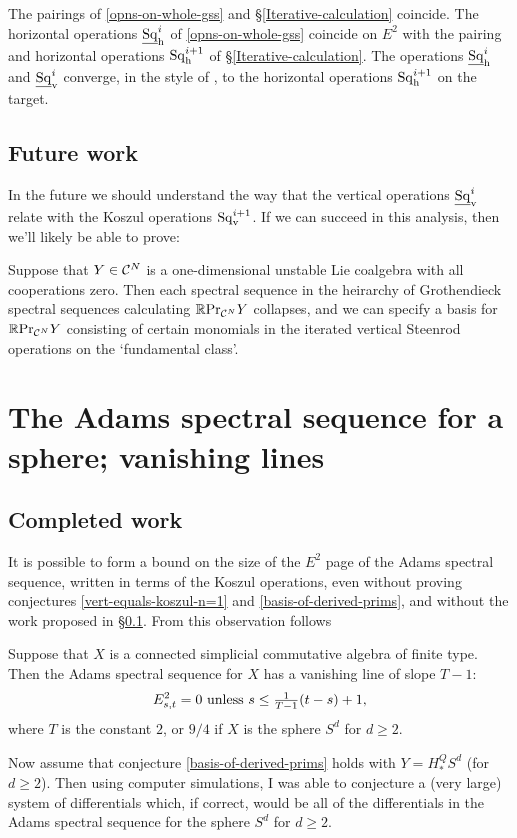 \documentclass[11pt]{article}
\newcommand{\Sq}{\mathrm{Sq}}
\begin{document}
\begin{thm}
The pairings of \ref{opns-on-whole-gss} and \S\ref{Iterative-calculation} coincide. The horizontal operations $\underline{\Sq}_\textup{h}^i$ of \ref{opns-on-whole-gss} coincide on $E^2$ with the pairing and horizontal operations ${\Sq}_\textup{h}^{i+1}$ of \S\ref{Iterative-calculation}. The operations $\underline{\Sq}_\textup{h}^i$ and $\underline{\Sq}_\textup{v}^i$ converge, in the style of \cite{SingerSteen1.pdf}, to the horizontal operations ${\Sq}_\textup{h}^{i+1}$ on the target.
\end{thm}
\subsection{Future work}\label{work-on-kos-opns-n>1}
In the future we should understand the way that the vertical operations $\underline{\Sq}_\textup{v}^i$ relate with the Koszul operations $\Sq_\textup{v}^{i+1}$.
If we can succeed in this analysis, then we'll likely be able to prove:
\begin{conjecture}\label{basis-of-derived-prims}
Suppose that $Y\in\mathcal{C}^N$ is a one-dimensional unstable Lie coalgebra with all cooperations zero. Then each spectral sequence in the heirarchy of Grothendieck spectral sequences calculating $\mathbb{R}\textup{Pr}_{\mathcal{C}^N}Y$ collapses, and we can specify a basis for $\mathbb{R}\textup{Pr}_{\mathcal{C}^N}Y$ consisting of certain monomials in the iterated vertical Steenrod operations on the `fundamental class'.
\end{conjecture}

\section{The Adams spectral sequence for a sphere; vanishing lines}
\subsection{Completed work}
It is possible to form a bound on the size of the $E^2$ page of the Adams spectral sequence, written in terms of the Koszul operations, even without proving conjectures \ref{vert-equals-koszul-n=1} and \ref{basis-of-derived-prims}, and without the work proposed in \S\ref{work-on-kos-opns-n>1}. From this observation follows
\begin{thm}\label{vanishing-line-theorem}
Suppose that $X$ is a connected simplicial commutative algebra of finite type. %
Then the Adams spectral sequence for $X$ has a vanishing line of slope $T-1$:
\[E^2_{s,t}=0\textup{\ unless $s\leq\tfrac{1}{T-1}(t-s)+1$,}\]
where $T$ is the constant $2$, or $9/4$ if $X$ is the sphere $S^d$ for $d\geq2$.
\end{thm}
Now assume that conjecture \ref{basis-of-derived-prims} holds with $Y=H^Q_* S^d$ (for $d\geq2$). Then using computer simulations, I was able to conjecture a (very large) system of differentials which, if correct, would be all of the differentials in the Adams spectral sequence for the sphere $S^d$ for $d\geq2$.
\end{document}
